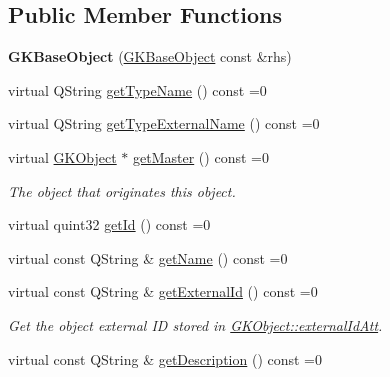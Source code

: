 \subsection*{Public Member Functions}
\begin{DoxyCompactItemize}
\item 
{\bfseries G\+K\+Base\+Object} (\hyperlink{classGKBaseObject}{G\+K\+Base\+Object} const \&rhs)\hypertarget{classGKBaseObject_a5133b2b343dfdaaf723eaa77d20f8ebb}{}\label{classGKBaseObject_a5133b2b343dfdaaf723eaa77d20f8ebb}

\item 
virtual Q\+String \hyperlink{classGKBaseObject_af7a70bb706e3d324e7f3992f0ee463c4}{get\+Type\+Name} () const =0
\item 
virtual Q\+String \hyperlink{classGKBaseObject_af1f4d7d9900badfb98f70bd17a6dfa81}{get\+Type\+External\+Name} () const =0
\item 
virtual \hyperlink{classGKObject}{G\+K\+Object} $\ast$ \hyperlink{classGKBaseObject_a874dc37f9f7df7778bedb9bce4a30e5c}{get\+Master} () const =0\hypertarget{classGKBaseObject_a874dc37f9f7df7778bedb9bce4a30e5c}{}\label{classGKBaseObject_a874dc37f9f7df7778bedb9bce4a30e5c}

\begin{DoxyCompactList}\small\item\em The object that originates this object. \end{DoxyCompactList}\item 
virtual quint32 \hyperlink{classGKBaseObject_a3399cf77ea1b1f9e12cd779a547df7d8}{get\+Id} () const =0
\item 
virtual const Q\+String \& \hyperlink{classGKBaseObject_ab7eb118912e83603c059300458282a5f}{get\+Name} () const =0
\item 
virtual const Q\+String \& \hyperlink{classGKBaseObject_ad36de1ef4a9964f1e664a4c9b348e839}{get\+External\+Id} () const =0\hypertarget{classGKBaseObject_ad36de1ef4a9964f1e664a4c9b348e839}{}\label{classGKBaseObject_ad36de1ef4a9964f1e664a4c9b348e839}

\begin{DoxyCompactList}\small\item\em Get the object external ID stored in \hyperlink{classGKBaseObject_a8287b7ae2c1c41363d3ad44dfc53190a}{G\+K\+Object\+::external\+Id\+Att}. \end{DoxyCompactList}\item 
virtual const Q\+String \& \hyperlink{classGKBaseObject_a364f48904a6ef6122498b9775b154866}{get\+Description} () const =0\hypertarget{classGKBaseObject_a364f48904a6ef6122498b9775b154866}{}\label{classGKBaseObject_a364f48904a6ef6122498b9775b154866}


\end{DoxyCompactItemize}
